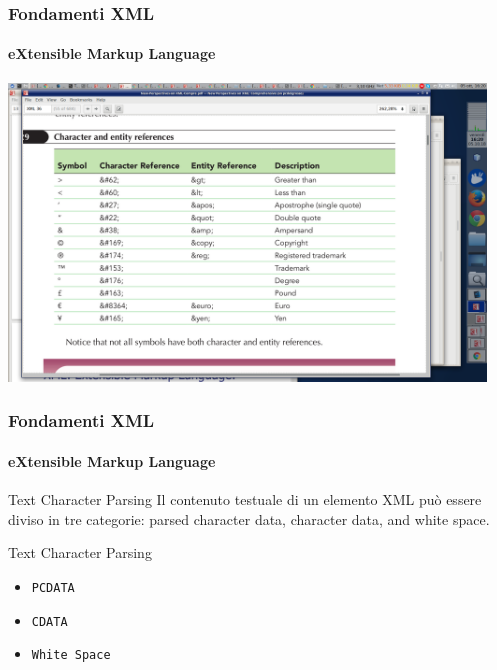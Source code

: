 \begin{frame}
	\frametitle{Fondamenti XML}
	\framesubtitle{eXtensible Markup Language}
	\addtocounter{nframe}{1}

	\begin{center}

		\includegraphics[width=0.95\textwidth]{imgs/xml-Character-Entity.png}
	\end{center}

\end{frame}


\begin{frame}
    \frametitle{Fondamenti XML}
    \framesubtitle{eXtensible Markup Language}
    \addtocounter{nframe}{1}

	\begin{block}{Text Character Parsing}
		Il contenuto testuale di un elemento XML può essere diviso in tre categorie:
		parsed character data, character data, and white space.
	\end{block}

	\begin{block}{Text Character Parsing}
		\begin{itemize}
			\item \texttt{PCDATA}
			\item \texttt{CDATA}
			\item \texttt{White Space}
		\end{itemize}
	\end{block}

\end{frame}


